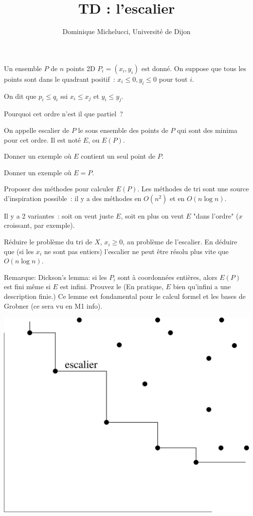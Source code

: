 \documentclass[a4paper]{article}
\begin{document}
\title{TD : l'escalier}
\author{Dominique Michelucci, Universit\'e de Dijon}
\maketitle

Un ensemble $P$ de $n$ points 2D $P_i=(x_i, y_i)$ est donn\'e.
On suppose que tous les points sont dans le quadrant positif~: $x_i \le 0, y_i\le 0$ pour tout $i$. 

On dit que $p_i \le q_i$ ssi $x_i \le x_j$ et $y_i\le y_j$.

Pourquoi cet ordre n'est il que partiel~? 

On appelle escalier de $P$ le sous ensemble des points de $P$ qui sont des minima pour cet ordre.
Il est not\'e $E$, ou $E(P)$.

Donner un exemple o\`u $E$ contient un seul point de $P$.

Donner un exemple o\`u $E=P$.

Proposer des m\'ethodes pour calculer $E(P)$. Les  m\'ethodes de tri sont une source d'inspiration possible~:
il y a des m\'ethodes en $O(n^2)$ et en $O(n\log n)$.

Il y a 2 variantes~: soit on veut juste $E$, soit en plus on veut $E$ "dans l'ordre" ($x$ croissant, par exemple).

R\'eduire le probl\`eme du tri de $X$, $x_i \ge 0$, au probl\`eme de l'escalier.
En d\'eduire que (si les $x_i$ ne sont pas entiers)
l'escalier ne peut \^etre r\'esolu plus vite que $O(n\log n)$.

Remarque: Dickson's lemma: si les $P_i$ sont \`a coordonn\'ees enti\`eres, alors $E(P)$ est fini m\^eme si $E$ est infini. Prouvez le
(En pratique, $E$ bien qu'infini a une description finie.)
Ce lemme est fondamental pour le calcul formel et les bases de Grobner (ce sera vu en M1 info).

\begin{center}
\includegraphics[width=0.6\linewidth]{escalier.eps}
\end{center}
\end{document}
